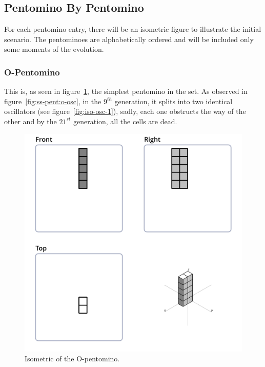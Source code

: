 
\subsection{Pentomino By Pentomino}
For each pentomino entry, there will be an isometric figure to illustrate the
initial scenario. The pentominoes are alphabetically ordered and will be included
only some moments of the evolution.

\subsubsection{O-Pentomino}
\label{sec:o-pentomino}

This is, as seen in figure~\ref{fig:iso-pent-o}, the simplest pentomino in the
set. As observed in figure~\ref{fig:ss-pent:o-osc}, in the $9^{th}$ generation,
it splits into two identical oscillators (see figure~\ref{fig:iso-osc-1}),
sadly, each one obstructs the way of the other and by the $21^{st}$ generation,
all the cells are dead.

\begin{figure}
	\centering
	\includegraphics[scale=0.3]{iso_diagrams/o.png}
	\caption{Isometric of the O-pentomino.}
  \label{fig:iso-pent-o}
\end{figure}

